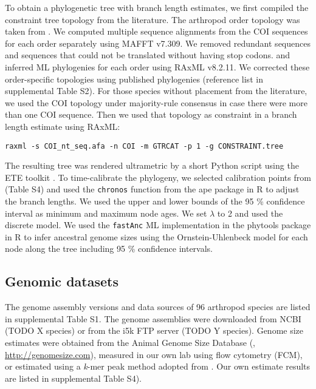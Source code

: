To obtain a phylogenetic tree with branch length estimates, we first
compiled the constraint tree topology from the literature. The arthropod
order topology was taken from \citep{Misof2014}. We computed multiple
sequence alignments from the COI sequences for each order separately
using MAFFT v7.309. We removed redundant sequences and sequences that
could not be translated without having stop codons. and inferred ML
phylogenies for each order using RAxML v8.2.11. We corrected these
order-specific topologies using published phylogenies (reference list in
supplemental Table S2). For those species without placement from the
literature, we used the COI topology under majority-rule consensus in
case there were more than one COI sequence. Then we used that topology
as constraint in a branch length estimate using RAxML:

\begin{verbatim}
raxml -s COI_nt_seq.afa -n COI -m GTRCAT -p 1 -g CONSTRAINT.tree
\end{verbatim}

The resulting tree was rendered ultrametric by a short Python script
using the ETE toolkit \citep{Huerta-Cepas2016}. To time-calibrate the
phylogeny, we selected calibration points from \citep{Misof2014} (Table
S4) and used the \texttt{chronos} function from the ape package in R to
adjust the branch lengths. We used the upper and lower bounds of the 95
\% confidence interval as minimum and maximum node ages. We set
\(\lambda\) to 2 and used the discrete model. We used the
\texttt{fastAnc} ML implementation in the phytools package
\citep{Revell2012} in R to infer ancestral genome sizes using the
Ornstein-Uhlenbeck model for each node along the tree including 95 \%
confidence intervals.

\subsection{Genomic datasets}\label{genomic-datasets}

The genome assembly versions and data sources of 96 arthropod species
are listed in supplemental Table S1. The genome assemblies were
downloaded from NCBI (TODO X species) or from the i5k FTP server (TODO Y
species). Genome size estimates were obtained from the Animal Genome
Size Database (\citep{Gregory2018}, \url{http://genomesize.com}),
measured in our own lab using flow cytometry (FCM), or estimated using a
\emph{k}-mer peak method adopted from \citet{Hozza2015}. Our own
estimate results are listed in supplemental Table S4).

